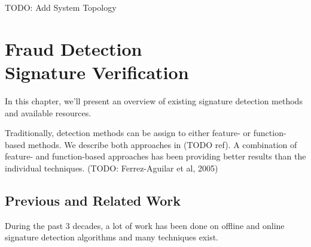 \documentclass[a4paper, oneside]{csthesis}
\begin{document}
TODO: Add System Topology





\chapter{Fraud Detection \\Signature Verification}
\label{chp:signature-verification}

In this chapter, we'll present an overview of existing signature detection methods and available resources.

Traditionally, detection methods can be assign to either feature- or function-based methods. We describe both approaches in (TODO ref). A combination of feature- and function-based approaches has been providing better results than the individual techniques. (TODO: Ferrez-Aguilar et al, 2005)






\section{Previous and Related Work}

During the past 3 decades, a lot of work has been done on offline and online signature detection algorithms and many techniques exist.
\end{document}
